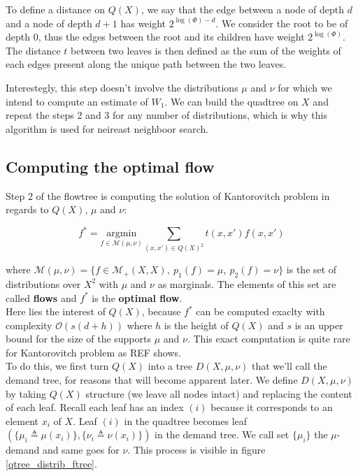 \documentclass{article}
\begin{document}
To define a distance on $Q(X)$, we say that the edge between a node of depth $d$ and a node of depth $d+1$ has weight $2^{\log(\Phi)-d}$. We consider the root to be of depth $0$, thus the edges between the root and its children have weight $2^{\log(\Phi)}$. The distance $t$ between two leaves is then defined as the sum of the weights of each edges present along the unique path between the two leaves.

Interestegly, this step doesn't involve the distributions $\mu$ and $\nu$ for which we intend to compute an estimate of $W_1$. We can build the quadtree on $X$ and repeat the steps 2 and 3 for any number of distributions, which is why this algorithm is used for neireast neighboor search. 

\subsection{Computing the optimal flow} \label{ssec:computing_optimal_flow}
Step 2 of the flowtree is computing the solution of Kantorovitch problem in regards to $Q(X)$, $\mu$ and $\nu$:

$$
f^* = \underset{f \in \mathcal{M}(\mu, \nu)}{\text{argmin}} \sum_{(x, x') \in Q(X)^2} t(x, x') f(x, x')
$$

where $\mathcal{M}(\mu, \nu) = \lbrace f \in \mathcal{M}_+(X, X),~ p_1(f) = \mu,~ p_2(f) = \nu \rbrace$ is the set of distributions over $X^2$ with $\mu$ and $\nu$ as marginals. The elements of this set are called \textbf{flows} and $f^*$ is the \textbf{optimal flow}.\\
Here lies the interest of $Q(X)$, because $f^*$ can be computed exaclty with complexity $\mathcal{O}(s(d+h))$ where $h$ is the height of $Q(X)$ and $s$ is an upper bound for the size of the supports $\mu$ and $\nu$. This exact computation is quite rare for Kantorovitch problem as REF shows.\\

To do this, we first turn $Q(X)$ into a tree $D(X, \mu, \nu)$ that we'll call the demand tree, for reasons that will become apparent later. We define $D(X, \mu, \nu)$ by taking $Q(X)$ structure (we leave all nodes intact) and replacing the content of each leaf. Recall each leaf has an index $(i)$ because it corresponds to an element $x_i$ of $X$. Leaf $(i)$ in the quadtree becomes leaf 
$\left( \lbrace \mu_i \triangleq \mu(x_i) \rbrace , \lbrace \nu_i \triangleq \nu(x_i) \rbrace \right)$ 
in the demand tree. We call set $\lbrace \mu_i \rbrace$ the $\mu$-demand and same goes for $\nu$. This process is visible in figure \ref{qtree_distrib_ftree}.
\end{document}
